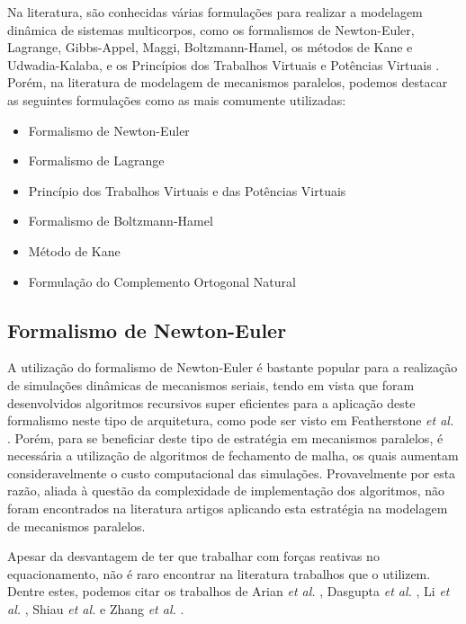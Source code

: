 \documentclass[]{politex}
\begin{document}
Na literatura, são conhecidas várias formulações para realizar a modelagem dinâmica de sistemas multicorpos, como os formalismos de Newton-Euler, Lagrange, Gibbs-Appel, Maggi, Boltzmann-Hamel, os métodos de Kane e Udwadia-Kalaba, e os Princípios dos Trabalhos Virtuais e Potências Virtuais \cite{23orsino}. Porém, na literatura de modelagem de mecanismos paralelos, podemos destacar as seguintes formulações como as mais comumente utilizadas:

\begin{itemize}
\item Formalismo de Newton-Euler
\item Formalismo de Lagrange
\item Princípio dos Trabalhos Virtuais e das Potências Virtuais
\item Formalismo de Boltzmann-Hamel
\item Método de Kane
\item Formulação do Complemento Ortogonal Natural
\end{itemize}

\subsection{Formalismo de Newton-Euler}

A utilização do formalismo de Newton-Euler é bastante popular para a realização de simulações dinâmicas de mecanismos seriais, tendo em vista que foram desenvolvidos algoritmos recursivos super eficientes para a aplicação deste formalismo neste tipo de arquitetura, como pode ser visto em Featherstone \emph{et al.} \cite{Featherstone}. Porém, para se beneficiar deste tipo de estratégia em mecanismos paralelos, é necessária a utilização de algoritmos de fechamento de malha, os quais aumentam consideravelmente o custo computacional das simulações. Provavelmente por esta razão, aliada à questão da complexidade de implementação dos algoritmos, não foram encontrados na literatura artigos aplicando esta estratégia na modelagem de mecanismos paralelos. 

Apesar da desvantagem de ter que trabalhar com forças reativas no equacionamento, não é raro encontrar na literatura trabalhos que o utilizem. Dentre estes, podemos citar os trabalhos de Arian \emph{et al.} \cite{Arian}, Dasgupta \emph{et al.} \cite{Dasgupta}, Li \emph{et al.} \cite{LiWang}, Shiau \emph{et al.} \cite{Shiau} e Zhang \emph{et al.} \cite{Zhang}.
\end{document}
